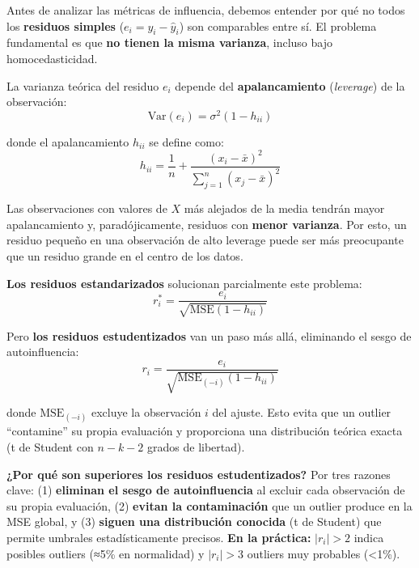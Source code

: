 \documentclass[
  letterpaper,
  DIV=11,
  numbers=noendperiod]{scrreprt}
\begin{document}
\begin{tcolorbox}[enhanced jigsaw, breakable, toprule=.15mm, bottomtitle=1mm, coltitle=black, colbacktitle=quarto-callout-note-color!10!white, titlerule=0mm, opacitybacktitle=0.6, bottomrule=.15mm, toptitle=1mm, title=\textcolor{quarto-callout-note-color}{\faInfo}\hspace{0.5em}{Fundamento teórico: de los residuos simples a los estudentizados}, arc=.35mm, rightrule=.15mm, opacityback=0, colframe=quarto-callout-note-color-frame, leftrule=.75mm, left=2mm, colback=white]

Antes de analizar las métricas de influencia, debemos entender por qué
no todos los \textbf{residuos simples} (\(e_i = y_i - \hat{y}_i\)) son
comparables entre sí. El problema fundamental es que \textbf{no tienen
la misma varianza}, incluso bajo homocedasticidad.

La varianza teórica del residuo \(e_i\) depende del
\textbf{apalancamiento} (\emph{leverage}) de la observación: \[
\text{Var}(e_i) = \sigma^2(1 - h_{ii})
\]

donde el apalancamiento \(h_{ii}\) se define como: \[
h_{ii} = \frac{1}{n} + \frac{(x_i - \bar{x})^2}{\sum_{j=1}^{n}(x_j - \bar{x})^2}
\]

Las observaciones con valores de \(X\) más alejados de la media tendrán
mayor apalancamiento y, paradójicamente, residuos con \textbf{menor
varianza}. Por esto, un residuo pequeño en una observación de alto
leverage puede ser más preocupante que un residuo grande en el centro de
los datos.

\textbf{Los residuos estandarizados} solucionan parcialmente este
problema: \[
r_i^* = \frac{e_i}{\sqrt{\text{MSE}(1 - h_{ii})}}
\]

Pero \textbf{los residuos estudentizados} van un paso más allá,
eliminando el sesgo de autoinfluencia: \[
r_i = \frac{e_i}{\sqrt{\text{MSE}_{(-i)}(1 - h_{ii})}}
\]

donde \(\text{MSE}_{(-i)}\) excluye la observación \(i\) del ajuste.
Esto evita que un outlier ``contamine'' su propia evaluación y
proporciona una distribución teórica exacta (t de Student con \(n-k-2\)
grados de libertad).

\textbf{¿Por qué son superiores los residuos estudentizados?} Por tres
razones clave: (1) \textbf{eliminan el sesgo de autoinfluencia} al
excluir cada observación de su propia evaluación, (2) \textbf{evitan la
contaminación} que un outlier produce en la MSE global, y (3)
\textbf{siguen una distribución conocida} (t de Student) que permite
umbrales estadísticamente precisos. \textbf{En la práctica:}
\(|r_i| > 2\) indica posibles outliers (≈5\% en normalidad) y
\(|r_i| > 3\) outliers muy probables (\textless1\%).

\end{tcolorbox}
\end{document}
